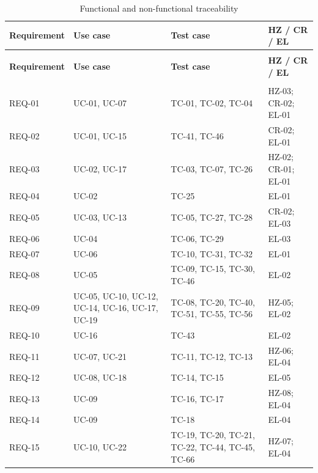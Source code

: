 \par\begingroup\scriptsize\setlength{\tabcolsep}{4pt}
\begin{longtable}{>{\raggedright\arraybackslash}p{}>{\raggedright\arraybackslash}p{}>{\raggedright\arraybackslash}p{}>{\raggedright\arraybackslash}p{}}
\caption{Functional and non-functional traceability}\label{tab:trace}\\
\toprule
\textbf{Requirement} & \textbf{Use case} & \textbf{Test case} & \textbf{HZ / CR / EL} \\ \midrule
\endfirsthead
\multicolumn{4}{l}{\small\itshape Functional and non-functional traceability (continued)}\\
\toprule
\textbf{Requirement} & \textbf{Use case} & \textbf{Test case} & \textbf{HZ / CR / EL} \\ \midrule
\endhead
\midrule
\multicolumn{4}{r}{\scriptsize Continued on the next page}\\
\endfoot
\bottomrule\endlastfoot
REQ-01 & UC-01, UC-07 & TC-01, TC-02, TC-04 & HZ-03; CR-02; EL-01 \\
REQ-02 & UC-01, UC-15 & TC-41, TC-46 & CR-02; EL-01 \\
REQ-03 & UC-02, UC-17 & TC-03, TC-07, TC-26 & HZ-02; CR-01; EL-01 \\
REQ-04 & UC-02 & TC-25 & EL-01 \\
REQ-05 & UC-03, UC-13 & TC-05, TC-27, TC-28 & CR-02; EL-03 \\
REQ-06 & UC-04 & TC-06, TC-29 & EL-03 \\
REQ-07 & UC-06 & TC-10, TC-31, TC-32 & EL-01 \\
REQ-08 & UC-05 & TC-09, TC-15, TC-30, TC-46 & EL-02 \\
REQ-09 & UC-05, UC-10, UC-12, UC-14, UC-16, UC-17, UC-19 & TC-08, TC-20, TC-40, TC-51, TC-55, TC-56 & HZ-05; EL-02 \\
REQ-10 & UC-16 & TC-43 & EL-02 \\
REQ-11 & UC-07, UC-21 & TC-11, TC-12, TC-13 & HZ-06; EL-04 \\
REQ-12 & UC-08, UC-18 & TC-14, TC-15 & EL-05 \\
REQ-13 & UC-09 & TC-16, TC-17 & HZ-08; EL-04 \\
REQ-14 & UC-09 & TC-18 & EL-04 \\
REQ-15 & UC-10, UC-22 & TC-19, TC-20, TC-21, TC-22, TC-44, TC-45, TC-66 & HZ-07; EL-04 \\

\end{longtable}
